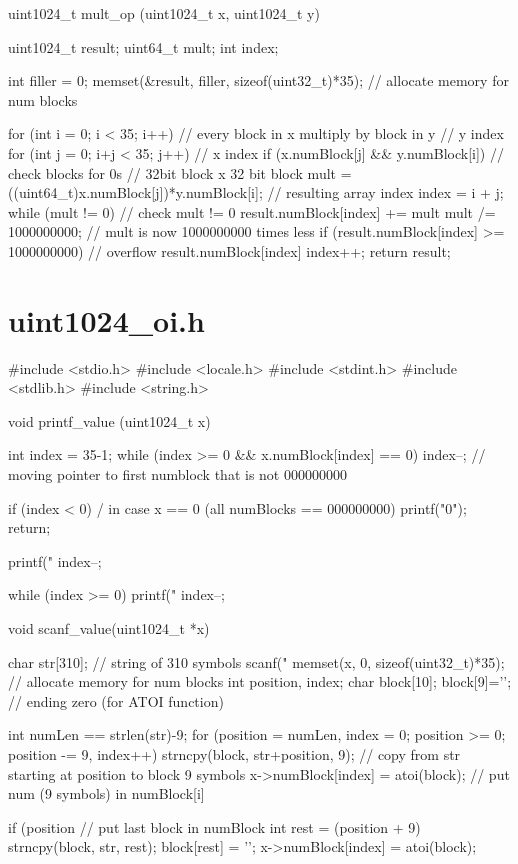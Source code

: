\documentclass[a4paper,14pt]{article}
\begin{document}
\begin{python}
uint1024_t mult_op (uint1024_t x, uint1024_t y)
{
    uint1024_t result;
    uint64_t mult;
    int index;

    int filler = 0;
    memset(&result, filler, sizeof(uint32_t)*35); // allocate memory for num blocks

    for (int i = 0; i < 35; i++) // every block in x multiply by block in y
    { // y index
        for (int j = 0; i+j < 35; j++)
        { // x index
            if (x.numBlock[j] && y.numBlock[i])
            { // check blocks for 0s
                // 32bit block x 32 bit block
                mult = ((uint64_t)x.numBlock[j])*y.numBlock[i];
                // resulting array index
                index = i + j;
                while (mult != 0)
                { // check mult != 0
                    result.numBlock[index] += mult %
                    mult /= 1000000000; // mult is now 1000000000 times less
                    if (result.numBlock[index] >= 1000000000) // overflow
                    {
                        result.numBlock[index] %
                    }
                    index++;
                }
            }
        }
    }
    return result;
}
\end{python}

\newpage
\section{uint1024\_oi.h}
\begin{python}
#include <stdio.h>
#include <locale.h>
#include <stdint.h>
#include <stdlib.h>
#include <string.h>

void printf_value (uint1024_t x)
{
    int index = 35-1;
    while (index >= 0 && x.numBlock[index] == 0)
    {
        index--; // moving pointer to first numblock that is not 000000000
    }

    if (index < 0) / in case x == 0 (all numBlocks == 000000000)
    {
        printf("0"); return;
    }

    printf("%
    index--;

    while (index >= 0)
    {
        printf("%
        index--;
    }
}

void scanf_value(uint1024_t *x)
{
    char str[310]; // string of 310 symbols
    scanf("%
    memset(x, 0, sizeof(uint32_t)*35); // allocate memory for num blocks
    int position, index;
    char block[10]; block[9]='\0'; // ending zero (for ATOI function)

    int numLen == strlen(str)-9;
    for (position = numLen, index = 0; position >= 0; position -= 9, index++)
    {
        strncpy(block, str+position, 9); // copy from str starting at position to block 9 symbols
        x->numBlock[index] = atoi(block); // put num (9 symbols) in numBlock[i]
    }

    if (position %
    { // put last block in numBlock
        int rest = (position + 9) %
        strncpy(block, str, rest); block[rest] = '\0';
        x->numBlock[index] =  atoi(block);
    }
}
\end{python}
\end{document}

